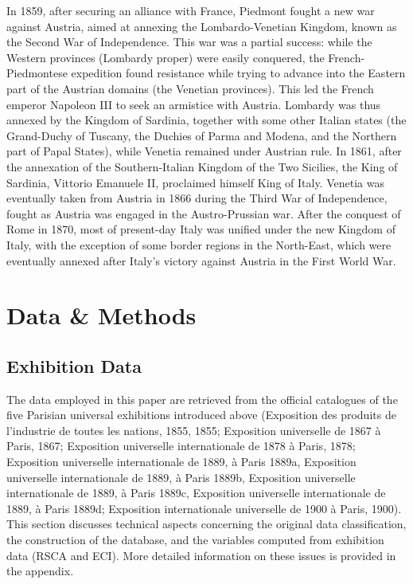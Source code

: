 In 1859, after securing an alliance with France, Piedmont fought a new war against Austria, aimed at annexing the Lombardo-Venetian Kingdom, known as the Second War of Independence. This war was a partial success: while the Western provinces (Lombardy proper) were easily conquered, the French-Piedmontese expedition found resistance while trying to advance into the Eastern part of the Austrian domains (the Venetian provinces). This led the French emperor Napoleon III to seek an armistice with Austria. Lombardy was thus annexed by the Kingdom of Sardinia, together with some other Italian states (the Grand-Duchy of Tuscany, the Duchies of Parma and Modena, and the Northern part of Papal States), while Venetia remained under Austrian rule. In 1861, after the annexation of the Southern-Italian Kingdom of the Two Sicilies, the King of Sardinia, Vittorio Emanuele II, proclaimed himself King of Italy. Venetia was eventually taken from Austria in 1866 during the Third War of Independence, fought as Austria was engaged in the Austro-Prussian war. After the conquest of Rome in 1870, most of present-day Italy was unified under the new Kingdom of Italy, with the exception of some border regions in the North-East, which were eventually annexed after Italy's victory against Austria in the First World War.


\section{Data \& Methods}

\subsection{Exhibition Data} 
The data employed in this paper are retrieved from the official catalogues of the five Parisian universal exhibitions introduced above (Exposition des produits de l’industrie de toutes les nations, 1855, 1855; Exposition universelle de 1867 à Paris, 1867; Exposition universelle internationale de 1878 à Paris, 1878; Exposition universelle internationale de 1889, à Paris 1889a, Exposition universelle internationale de 1889, à Paris 1889b, Exposition universelle internationale de 1889, à Paris 1889c, Exposition universelle internationale de 1889, à Paris 1889d; Exposition internationale universelle de 1900 à Paris, 1900). This section discusses technical aspects concerning the original data classification, the construction of the database, and the variables computed from exhibition data (RSCA and ECI). More detailed information on these issues is provided in the appendix.

